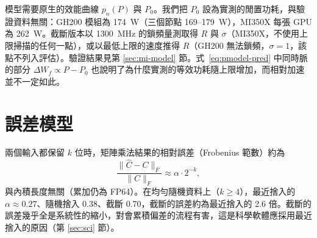 模型需要原生的效能曲線 $p_n(P)$ 與 $P_0$。我們把 $P_0$ 設為實測的閒置功耗，與驗證資料無關：GH200 模組為 174~W（三個節點 169–179~W），MI350X 每張 GPU 為 262~W。截斷版本以 1300~MHz 的鎖頻量測取得 $R$ 與 $\sigma$（MI350X，不使用上限掃描的任何一點），或以最低上限的速度推得 $R$（GH200 無法鎖頻，$\sigma=1$，該點不列入評估）。驗證結果見第 \ref{sec:mi-model} 節。式~\eqref{eq:pmodel-pred} 中同時脈的部分 $\Delta W_f\propto P-P_0$ 也說明了為什麼實測的等效功耗隨上限增加，而相對加速並不一定如此。

\section{誤差模型}\label{sec:errmodel}

兩個輸入都保留 $k$ 位時，矩陣乘法結果的相對誤差（Frobenius 範數）約為
\begin{equation}
  \frac{\lVert \widehat{C} - C \rVert_F}{\lVert C \rVert_F} \approx \alpha \cdot 2^{-k},
  \label{eq:errmodel}
\end{equation}
與內積長度無關（累加仍為 FP64）。在均勻隨機資料上（$k \ge 4$），最近捨入的 $\alpha \approx 0.27$、隨機捨入 0.38、截斷 0.70，截斷的誤差約為最近捨入的 2.6 倍。截斷的誤差幾乎全是系統性的縮小，對會累積偏差的流程有害，這是科學軟體應採用最近捨入的原因（第 \ref{sec:sci} 節）。

